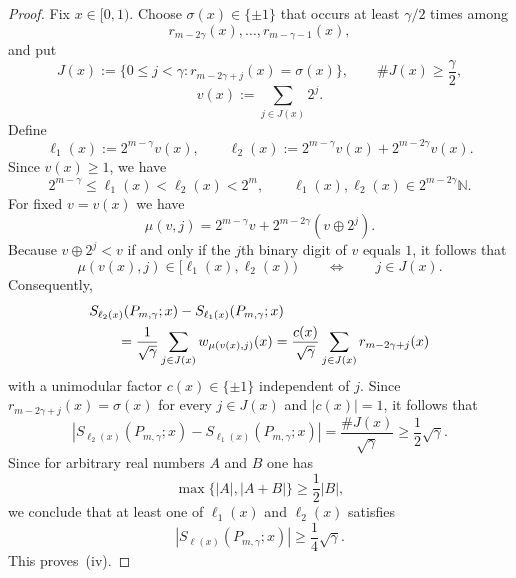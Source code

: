 \documentclass[11pt]{amsart}
\numberwithin{equation}{section}
\theoremstyle{plain}
\begin{document}
\begin{proof}
Fix $x\in[0,1)$. Choose $\sigma(x)\in\{\pm1\}$ that occurs at least $\gamma
/2$ times among 
\begin{equation*}
r_{m-2\gamma}(x),\dots,r_{m-\gamma-1}(x),
\end{equation*}
and put 
\begin{equation*}
J(x):=\{0\le j<\gamma: r_{m-2\gamma+j}(x)=\sigma(x)\}, \qquad \#J(x)\ge 
\frac{\gamma}{2},
\end{equation*}
\begin{equation*}
v(x):=\sum_{j\in J(x)} 2^j.
\end{equation*}
Define 
\begin{equation*}
\ell_1(x):=2^{m-\gamma}v(x), \qquad
\ell_2(x):=2^{m-\gamma}v(x)+2^{m-2\gamma}v(x).
\end{equation*}
Since $v(x)\ge1$, we have 
\begin{equation*}
2^{m-\gamma}\le \ell_1(x)<\ell_2(x)<2^m, \qquad \ell_1(x),\ell_2(x)\in
2^{m-2\gamma}\mathbb{N}.
\end{equation*}
For fixed $v=v(x)$ we have 
\begin{equation*}
\mu(v,j)=2^{m-\gamma}v+2^{m-2\gamma}(v\oplus 2^j).
\end{equation*}
Because $v\oplus 2^j<v$ if and only if the $j$th binary digit of $v$ equals $%
1$, it follows that 
\begin{equation*}
\mu(v(x),j)\in [\ell_1(x),\ell_2(x)) \qquad \Longleftrightarrow \qquad j\in
J(x).
\end{equation*}
Consequently, 
\begin{align*}
&S_{\ell_2(x)}(P_{m,\gamma};x)-S_{\ell_1(x)}(P_{m,\gamma};x) \\
&\qquad = \frac{1}{\sqrt{\gamma}}\sum_{j\in J(x)} w_{\mu(v(x),j)}(x) =\frac{%
c(x)}{\sqrt{\gamma}}\sum_{j\in J(x)} r_{m-2\gamma+j}(x)
\end{align*}
with a unimodular factor $c(x)\in\{\pm1\}$ independent of $j$. Since $%
r_{m-2\gamma+j}(x)=\sigma(x)$ for every $j\in J(x)$ and $|c(x)|=1$, it
follows that 
\begin{equation*}
\left|S_{\ell_2(x)}(P_{m,\gamma};x)-S_{\ell_1(x)}(P_{m,\gamma};x)\right|= 
\frac{\#J(x)}{\sqrt{\gamma}}\ge \frac12\sqrt{\gamma}.
\end{equation*}
Since for arbitrary real numbers $A$ and $B$ one has 
\begin{equation*}
\max\{|A|,|A+B|\}\ge \frac12|B|,
\end{equation*}
we conclude that at least one of $\ell_1(x)$ and $\ell_2(x)$ satisfies 
\begin{equation*}
|S_{\ell(x)}(P_{m,\gamma};x)|\ge \frac14\sqrt{\gamma}.
\end{equation*}
This proves~(iv).
\end{proof}
\end{document}
